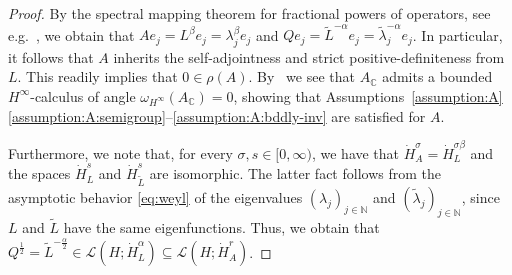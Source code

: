 \documentclass[reqno]{amsart}
\numberwithin{equation}{section}
\newcommand{\C}{\mathbb{C}}
\newcommand{\N}{\mathbb{N}}
\theoremstyle{remark}
\theoremstyle{definition}
\begin{document}
\begin{proof}
	By the spectral mapping theorem for fractional powers of operators, 
	see e.g.\ \cite[Section 5.3]{Carracedo2001}, we obtain that 
	$Ae_j = L^\beta e_j = \lambda_j^\beta e_j$ 
	and 
	${Qe_j =  \widetilde{L}^{-\alpha} e_j = \widetilde \lambda_j^{-\alpha} e_j}$. 
	In particular, it follows that $A$ inherits the self-adjointness and strict
	positive-definiteness
	from $L$. 
	This readily implies that $0\in \rho(A)$. 
	By~\cite[Proposition~10.2.23]{AnalysisInBanachSpacesII} 
	we see that $A_\C$ admits a bounded $H^\infty$-calculus
	of angle $\omega_{H^\infty}(A_\C)=0$,
	showing that
	Assumptions~\ref{assumption:A}\ref{assumption:A:semigroup}--\ref{assumption:A:bddly-inv}
	are satisfied for $A$. 
	
	Furthermore, we note that, 
	for every $\sigma,s\in[0,\infty)$, 
	we have that 
	$\dot H_A^\sigma = \dot H_L^{\sigma\beta}$ 
	and  
	the spaces $\dot H_L^s$ 
	and $\dot H_{\widetilde L}^s$ are isomorphic. 
	The latter fact follows from 
	the asymptotic behavior \eqref{eq:weyl}
	of the eigenvalues 
	$(\lambda_j)_{j\in\N}$ 
	and 
	$(\widetilde{\lambda}_j)_{j\in\N}$, 
	since $L$ 
	and $\widetilde{L}$ have the same eigenfunctions. 
	Thus, we obtain that 
	$Q^{\frac{1}{2}} = \widetilde{L}^{-\frac{\alpha}{2}} 
	\in \mathscr L(H;\dot H_L^{\alpha}) 
	\subseteq 
	\mathscr L(H; \dot H_A^r)$. 
	

\end{proof}
\end{document}
